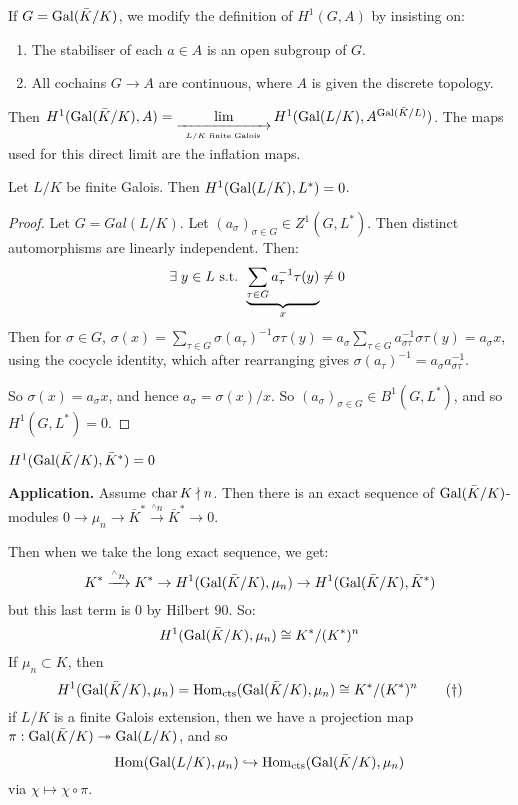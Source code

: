 \documentclass[10pt,a4paper]{article}
\begin{document}
If $G = \operatorname{Gal}(\bar{K}/K)$, we modify the definition of $H^1(G,A)$ by insisting on:
\begin{enumerate}
  \item The stabiliser of each $a \in A$ is an open subgroup of $G$.
  \item All cochains $G \to A$ are continuous, where $A$ is given the discrete topology.
\end{enumerate}
Then $H^1(\operatorname{Gal}(\bar{K}/K),A) = \lim\limits_{\xrightarrow[L/K\text{ finite Galois}]{}}H^1(\operatorname{Gal}(L/K), A^{\operatorname{Gal}(\bar{K}/L)})$. The maps used for this direct limit are the inflation maps.
\begin{theorem}
  Let $L/K$ be finite Galois. Then $H^1(\operatorname{Gal}(L/K), L^\ast) = 0$.
\end{theorem}
\begin{proof}
  Let $G = Gal(L/K)$. Let $(a_\sigma)_{\sigma \in G} \in Z^1(G, L^\ast)$. Then distinct automorphisms are linearly independent. Then:
  \begin{align*}
    \exists y \in L \st \underbrace{\sum_{\tau \in G}a_\tau^{-1}\tau(y)}_x \neq 0\
  \end{align*}
  Then for $\sigma \in G$, $\sigma(x) = \sum_{\tau \in G}\sigma(a_\tau)^{-1}\sigma\tau(y) = a_\sigma\sum_{\tau \in G} a_{\sigma\tau}^{-1}\sigma\tau(y) = a_\sigma x$, using the cocycle identity, which after rearranging gives $\sigma(a_\tau)^{-1} = a_\sigma a_{\sigma\tau}^{-1}$.

  So $\sigma(x) = a_\sigma x$, and hence $a_\sigma = \sigma(x)/x$. So $(a_\sigma)_{\sigma \in G} \in B^1(G,L^\ast)$, and so $H^1(G, L^\ast) = 0$.
\end{proof}
\begin{corollary}
  $H^1(\operatorname{Gal}(\bar{K}/K), \bar{K}^\ast) = 0$
\end{corollary}
\textbf{Application.} Assume $\operatorname{char} K \nmid n$. Then there is an exact sequence of $\operatorname{Gal}(\bar{K}/K)$-modules $0 \to \mu_n \to \bar{K}^\ast \xrightarrow{^\wedge n} \bar{K}^\ast \to 0$.

Then when we take the long exact sequence, we get:
\[K^* \xrightarrow{^\wedge n} K^\ast \to H^1(\operatorname{Gal}(\bar{K}/K), \mu_n) \to H^1(\operatorname{Gal}(\bar{K}/K), \bar{K}^\ast)\]
but this last term is 0 by Hilbert 90. So:
\[H^1(\operatorname{Gal}(\bar{K}/K), \mu_n) \cong K^\ast/(K^\ast)^n\]
If $\mu_n \subset K$, then
\[H^1(\operatorname{Gal}(\bar{K}/K), \mu_n) = \operatorname{Hom}_{\text{cts}}(\operatorname{Gal}(\bar{K}/K), \mu_n) \cong K^\ast/(K^\ast)^n\tag{$\dagger$}\]
if $L/K$ is a finite Galois extension, then we have a projection map $\pi:\operatorname{Gal}(\bar{K}/K) \twoheadrightarrow \operatorname{Gal}(L/K)$, and so
\[\operatorname{Hom}(\operatorname{Gal}(L/K), \mu_n) \hookrightarrow \operatorname{Hom}_{\text{cts}}(\operatorname{Gal}(\bar{K}/K), \mu_n)\]
via $\chi \mapsto \chi\circ\pi$.
\end{document}
